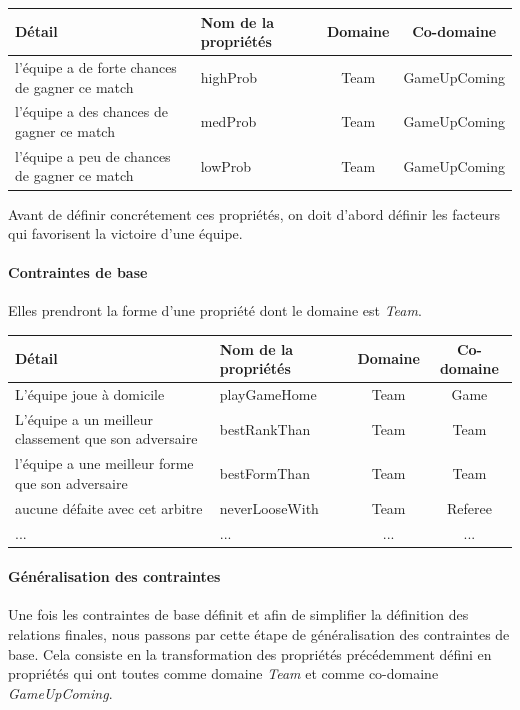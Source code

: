 \documentclass[oneside,13pt,a4paper]{article}
\begin{document}
\begin{tabular}{| p{5cm} | l | c | c |}
  \hline
  Détail & Nom de la propriétés & Domaine & Co-domaine\\ \hline
  l'équipe a de forte chances de gagner ce match & highProb & Team & GameUpComing  \\ \hline
  l'équipe a des chances de gagner ce match & medProb & Team & GameUpComing  \\ \hline
  l'équipe a peu de chances de gagner ce match & lowProb & Team & GameUpComing  \\
  \hline
\end{tabular}

Avant de définir concrétement ces propriétés, on doit d'abord définir les facteurs qui favorisent la victoire d'une équipe.

\paragraph{Contraintes de base}

Elles prendront la forme d’une propriété dont le domaine est \textit{Team}.

\begin{tabular}{| p{5cm} | l | c | c |}
  \hline
  Détail & Nom de la propriétés & Domaine & Co-domaine\\ \hline
  L'équipe joue à domicile & playGameHome & Team & Game  \\ \hline
  L'équipe a un meilleur classement que son adversaire & bestRankThan & Team & Team  \\ \hline
  l'équipe a une meilleur forme que son adversaire & bestFormThan & Team & Team  \\ \hline
  aucune défaite avec cet arbitre & neverLooseWith & Team & Referee \\ \hline
  ... & ... & ... & ...\\
  \hline
\end{tabular}

\paragraph{Généralisation des contraintes} Une fois les contraintes de base définit et afin de simplifier la définition des relations finales, nous passons par cette étape de généralisation des contraintes de base. Cela consiste en la transformation des propriétés précédemment défini en propriétés qui ont toutes comme domaine \textit{Team} et comme co-domaine \textit{GameUpComing}.
\end{document}
